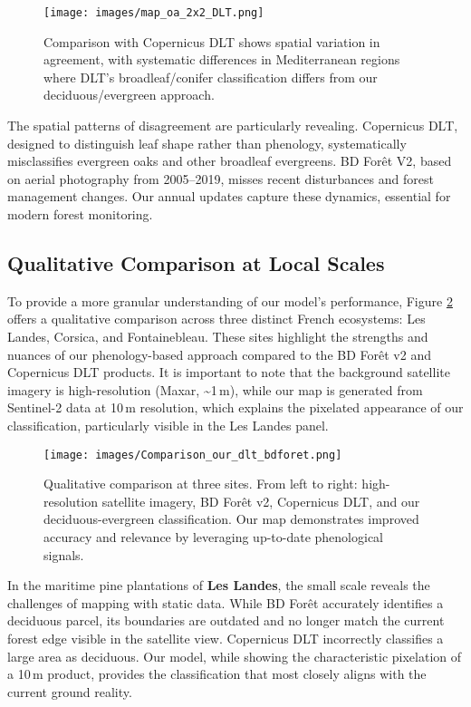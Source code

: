 \documentclass[utf8]{FrontiersinHarvard}
\begin{document}
\begin{figure}[H]
    \centering
    \texttt{[image: images/map\_oa\_2x2\_DLT.png]}
    \caption{Comparison with Copernicus DLT shows spatial variation in agreement, with systematic differences in Mediterranean regions where DLT's broadleaf/conifer classification differs from our deciduous/evergreen approach.}
    \label{fig:agreement_dlt}
\end{figure}

The spatial patterns of disagreement are particularly revealing. Copernicus DLT, designed to distinguish leaf shape rather than phenology, systematically misclassifies evergreen oaks and other broadleaf evergreens. BD Forêt V2, based on aerial photography from 2005–2019, misses recent disturbances and forest management changes. Our annual updates capture these dynamics, essential for modern forest monitoring.

\subsection{Qualitative Comparison at Local Scales}

To provide a more granular understanding of our model's performance, Figure \ref{fig:comparison_sites} offers a qualitative comparison across three distinct French ecosystems: Les Landes, Corsica, and Fontainebleau. These sites highlight the strengths and nuances of our phenology-based approach compared to the BD Forêt v2 and Copernicus DLT products. It is important to note that the background satellite imagery is high-resolution (Maxar, \textasciitilde1\,m), while our map is generated from Sentinel-2 data at 10\,m resolution, which explains the pixelated appearance of our classification, particularly visible in the Les Landes panel.

\begin{figure}[H]
    \centering
    \texttt{[image: images/Comparison\_our\_dlt\_bdforet.png]}
    \caption{Qualitative comparison at three sites. From left to right: high-resolution satellite imagery, BD Forêt v2, Copernicus DLT, and our deciduous-evergreen classification. Our map demonstrates improved accuracy and relevance by leveraging up-to-date phenological signals.}
    \label{fig:comparison_sites}
\end{figure}

In the maritime pine plantations of \textbf{Les Landes}, the small scale reveals the challenges of mapping with static data. While BD Forêt accurately identifies a deciduous parcel, its boundaries are outdated and no longer match the current forest edge visible in the satellite view. Copernicus DLT incorrectly classifies a large area as deciduous. Our model, while showing the characteristic pixelation of a 10\,m product, provides the classification that most closely aligns with the current ground reality.
\end{document}
